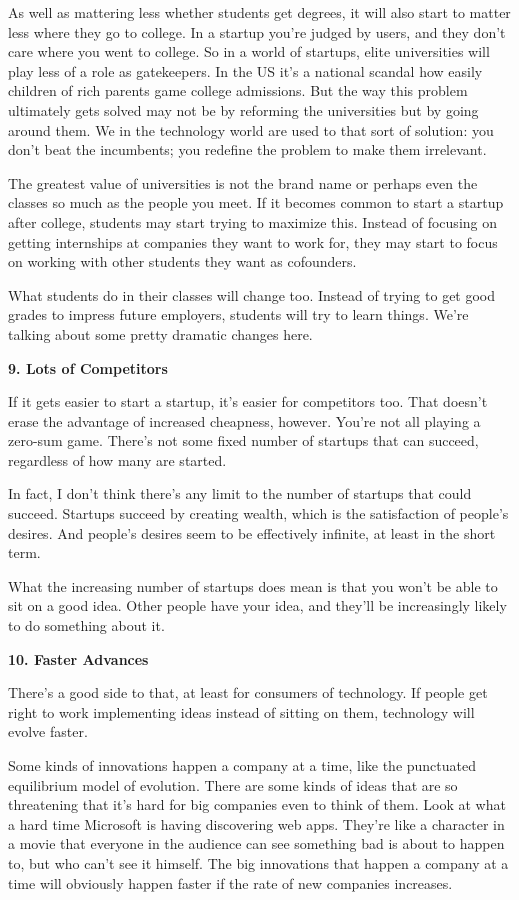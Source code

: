 As well as mattering less whether students get degrees, it will also
start to matter less where they go to college. In a startup you're
judged by users, and they don't care where you went to college. So in a
world of startups, elite universities will play less of a role as
gatekeepers. In the US it's a national scandal how easily children of
rich parents game college admissions. But the way this problem
ultimately gets solved may not be by reforming the universities but by
going around them. We in the technology world are used to that sort of
solution: you don't beat the incumbents; you redefine the problem to
make them irrelevant.

The greatest value of universities is not the brand name or perhaps even
the classes so much as the people you meet. If it becomes common to
start a startup after college, students may start trying to maximize
this. Instead of focusing on getting internships at companies they want
to work for, they may start to focus on working with other students they
want as cofounders.

What students do in their classes will change too. Instead of trying to
get good grades to impress future employers, students will try to learn
things. We're talking about some pretty dramatic changes here.

\textbf{9. Lots of Competitors}

If it gets easier to start a startup, it's easier for competitors too.
That doesn't erase the advantage of increased cheapness, however. You're
not all playing a zero-sum game. There's not some fixed number of
startups that can succeed, regardless of how many are started.

In fact, I don't think there's any limit to the number of startups that
could succeed. Startups succeed by creating wealth, which is the
satisfaction of people's desires. And people's desires seem to be
effectively infinite, at least in the short term.

What the increasing number of startups does mean is that you won't be
able to sit on a good idea. Other people have your idea, and they'll be
increasingly likely to do something about it.

\textbf{10. Faster Advances}

There's a good side to that, at least for consumers of technology. If
people get right to work implementing ideas instead of sitting on them,
technology will evolve faster.

Some kinds of innovations happen a company at a time, like the
punctuated equilibrium model of evolution. There are some kinds of ideas
that are so threatening that it's hard for big companies even to think
of them. Look at what a hard time Microsoft is having discovering web
apps. They're like a character in a movie that everyone in the audience
can see something bad is about to happen to, but who can't see it
himself. The big innovations that happen a company at a time will
obviously happen faster if the rate of new companies increases.

